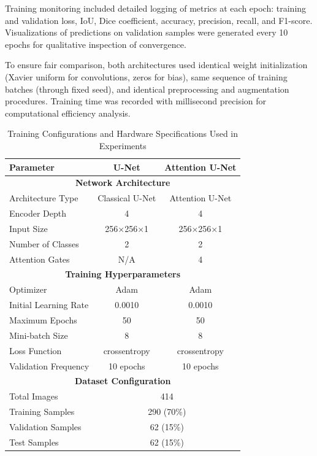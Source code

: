 \documentclass[12pt,a4paper,twoside]{article}
\begin{document}
Training monitoring included detailed logging of metrics at each epoch: training and validation loss, IoU, Dice coefficient, accuracy, precision, recall, and F1-score. Visualizations of predictions on validation samples were generated every 10 epochs for qualitative inspection of convergence.

To ensure fair comparison, both architectures used identical weight initialization (Xavier uniform for convolutions, zeros for bias), same sequence of training batches (through fixed seed), and identical preprocessing and augmentation procedures. Training time was recorded with millisecond precision for computational efficiency analysis.

\begin{table}[htbp]
\centering
\caption{Training Configurations and Hardware Specifications Used in Experiments}
\label{tab:training_configurations}
\begin{tabular}{|l|c|c|}
\hline
\textbf{Parameter} & \textbf{U-Net} & \textbf{Attention U-Net} \\
\hline
\hline
\multicolumn{3}{|c|}{\textbf{Network Architecture}} \\
\hline
Architecture Type & Classical U-Net & Attention U-Net \\
Encoder Depth & 4 & 4 \\
Input Size & 256×256×1 & 256×256×1 \\
Number of Classes & 2 & 2 \\
Attention Gates & N/A & 4 \\
\hline
\multicolumn{3}{|c|}{\textbf{Training Hyperparameters}} \\
\hline
Optimizer & Adam & Adam \\
Initial Learning Rate & 0.0010 & 0.0010 \\
Maximum Epochs & 50 & 50 \\
Mini-batch Size & 8 & 8 \\
Loss Function & crossentropy & crossentropy \\
Validation Frequency & 10 epochs & 10 epochs \\
\hline
\multicolumn{3}{|c|}{\textbf{Dataset Configuration}} \\
\hline
Total Images & \multicolumn{2}{c|}{414} \\
Training Samples & \multicolumn{2}{c|}{290 (70\%)} \\
Validation Samples & \multicolumn{2}{c|}{62 (15\%)} \\
Test Samples & \multicolumn{2}{c|}{62 (15\%)} \\

\end{tabular}
\end{table}
\end{document}
